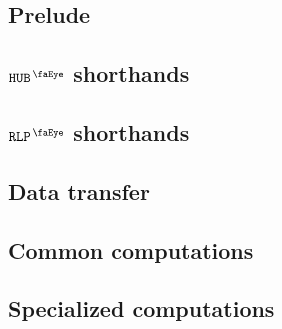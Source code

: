 \subsection{Prelude}                         \label{user txn data: processing: user: prelude}                        
\subsection{$\isUserTxnHubView$ shorthands}  \label{user txn data: processing: user: hub view shorthands}            
\subsection{$\isUserTxnRlpView$ shorthands}  \label{user txn data: processing: user: rlp view shorthands}            
\subsection{Data transfer}                   \label{user txn data: processing: user: data transafer}                 
\subsection{Common computations}             \label{user txn data: processing: user: common computations}            
\subsection{Specialized computations}        \label{user txn data: processing: user: specialized computations}       
